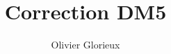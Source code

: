 \documentclass[a4paper, 11pt,reqno]{article}
\author{Olivier Glorieux}
\begin{document}
\title{Correction DM5 }









%
%
% 
% 
%
%
\end{document}

